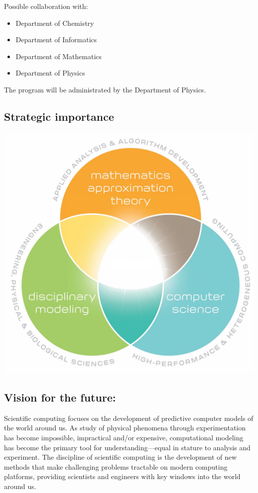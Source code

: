 \documentclass[%
oneside,                 %
final,                   %
10pt]{article}
\begin{document}
Possible collaboration with:

\begin{itemize}
 \item Department of Chemistry

 \item Department of Informatics

 \item Department of Mathematics

 \item Department of Physics
\end{itemize}

\noindent
The program will be administrated by the Department of Physics.



\subsection{Strategic importance}

\vspace{6mm}

\centerline{\includegraphics[width=0.6\linewidth]{figslides/cs.jpg}}

\vspace{6mm}

\subsection{Vision for the future:}

Scientific computing focuses on the development of predictive computer
models of the world around us. As study of physical phenomena through
experimentation has become impossible, impractical and/or expensive,
computational modeling has become the primary tool for
understanding—equal in stature to analysis and experiment. 
The discipline of scientific computing
is the development of new methods that make challenging problems
tractable on modern computing platforms, providing scientists and
engineers with key windows into the world around us.
\end{document}

